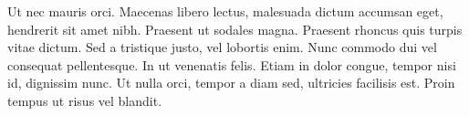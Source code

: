 Ut nec mauris orci. Maecenas libero lectus, malesuada dictum accumsan eget, hendrerit sit amet nibh. Praesent ut sodales magna. Praesent rhoncus quis turpis vitae dictum. Sed a tristique justo, vel lobortis enim. Nunc commodo dui vel consequat pellentesque. In ut venenatis felis. Etiam in dolor congue, tempor nisi id, dignissim nunc. Ut nulla orci, tempor a diam sed, ultricies facilisis est. Proin tempus ut risus vel blandit. 